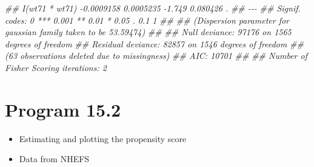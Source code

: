 \documentclass[
  10pt,
  a4paper,
]{book}
\newenvironment{Shaded}{\begin{snugshade}}{\end{snugshade}}
\newcommand{\DocumentationTok}[1]{\textcolor[rgb]{0.37,0.37,0.37}{\textit{#1}}}
\providecommand{\tightlist}{%
  \setlength{\itemsep}{0pt}\setlength{\parskip}{0pt}}
\begin{document}
\begin{Shaded}
\begin{Highlighting}[]
\DocumentationTok{\#\# I(wt71 * wt71)                     {-}0.0009158  0.0005235  {-}1.749 0.080426 .  }
\DocumentationTok{\#\# {-}{-}{-}}
\DocumentationTok{\#\# Signif. codes:  0 \textquotesingle{}***\textquotesingle{} 0.001 \textquotesingle{}**\textquotesingle{} 0.01 \textquotesingle{}*\textquotesingle{} 0.05 \textquotesingle{}.\textquotesingle{} 0.1 \textquotesingle{} \textquotesingle{} 1}
\DocumentationTok{\#\# }
\DocumentationTok{\#\# (Dispersion parameter for gaussian family taken to be 53.59474)}
\DocumentationTok{\#\# }
\DocumentationTok{\#\#     Null deviance: 97176  on 1565  degrees of freedom}
\DocumentationTok{\#\# Residual deviance: 82857  on 1546  degrees of freedom}
\DocumentationTok{\#\#   (63 observations deleted due to missingness)}
\DocumentationTok{\#\# AIC: 10701}
\DocumentationTok{\#\# }
\DocumentationTok{\#\# Number of Fisher Scoring iterations: 2}
\end{Highlighting}
\end{Shaded}

\section{Program 15.2}\label{program-15.2}

\begin{itemize}
\tightlist
\item
  Estimating and plotting the propensity score
\item
  Data from NHEFS
\end{itemize}
\end{document}
